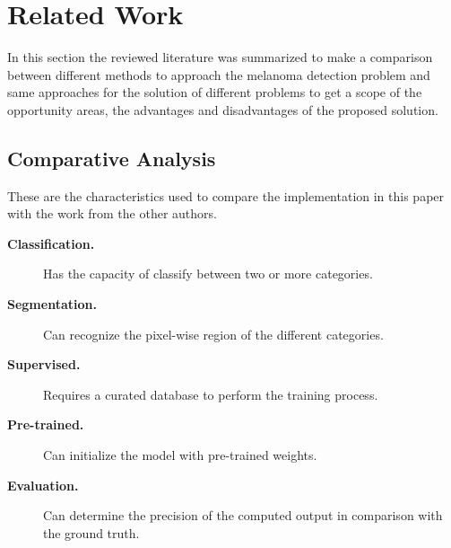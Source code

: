 \section{Related Work}
In this section the reviewed literature was summarized to make a comparison between different methods to approach the melanoma detection problem and same approaches for the solution of different problems to get a scope of the opportunity areas, the advantages and disadvantages of the proposed solution.

\subsection{Comparative Analysis}

These are the characteristics used to compare the implementation in this paper with the work from the other authors.
\begin{description}
  \item[\textbf{Classification.}] Has the capacity of classify between two or more categories.
  \item[\textbf{Segmentation.}] Can recognize the pixel-wise region of the different categories.
  \item[\textbf{Supervised.}] Requires a curated database to perform the training process.
  \item[\textbf{Pre-trained.}] Can initialize the model with pre-trained weights.
  \item[\textbf{Evaluation.}] Can determine the precision of the computed output in comparison with the ground truth.     
\end{description}

